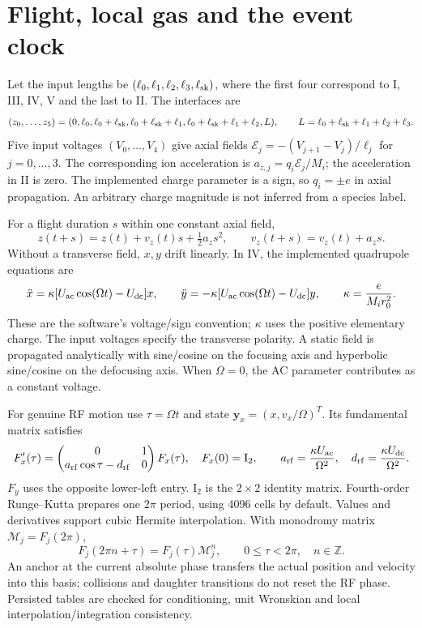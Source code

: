 \documentclass[10pt,a4paper]{article}
\begin{document}
\clearpage
\section{Flight, local gas and the event clock}\label{app:flight}
Let the input lengths be $(\ell_0,\ell_1,\ell_2,\ell_3,\ell_{\rm sk})$,
where the first four correspond to I, III, IV, V and the last to II. The interfaces are
\[
 (z_0,\ldots,z_5)=
 (0,\ell_0,\ell_0+\ell_{\rm sk},
 \ell_0+\ell_{\rm sk}+\ell_1,
 \ell_0+\ell_{\rm sk}+\ell_1+\ell_2,L),
 \qquad L=\ell_0+\ell_{\rm sk}+\ell_1+\ell_2+\ell_3.
\]
Five input voltages $(V_0,\ldots,V_4)$ give axial fields
$\mathcal E_j=-(V_{j+1}-V_j)/\ell_j$ for $j=0,\ldots,3$.
The corresponding ion acceleration is $a_{z,j}=q_i\mathcal E_j/M_i$;
the acceleration in II is zero. The implemented charge parameter is a sign,
so $q_i=\pm e$ in axial propagation. An arbitrary charge magnitude is not
inferred from a species label.

For a flight duration $s$ within one constant axial field,
\[
 z(t+s)=z(t)+v_z(t)s+\tfrac12a_zs^2,\qquad
 v_z(t+s)=v_z(t)+a_zs.
\]
Without a transverse field, $x,y$ drift linearly. In IV, the implemented
quadrupole equations are
\begin{equation}
 \ddot x=\kappa[U_{\rm ac}\cos(\Omega t)-U_{\rm dc}]x,
 \qquad
 \ddot y=-\kappa[U_{\rm ac}\cos(\Omega t)-U_{\rm dc}]y,
 \qquad \kappa=\frac{e}{M_ir_0^2}.\label{eq:rf}
\end{equation}
These are the software's voltage/sign convention; $\kappa$ uses the positive
elementary charge. The input voltages specify the transverse polarity. A
static field is propagated analytically with sine/cosine on the focusing axis
and hyperbolic sine/cosine on the defocusing axis. When $\Omega=0$, the AC
parameter contributes as a constant voltage.

For genuine RF motion use $\tau=\Omega t$ and state
$\mathbf y_x=(x,v_x/\Omega)^T$. Its fundamental matrix satisfies
\[
 F_x'(\tau)=
 \begin{pmatrix}0&1\\a_{\rm rf}\cos\tau-d_{\rm rf}&0\end{pmatrix}F_x(\tau),
 \quad F_x(0)=\mathrm I_2,\qquad
 a_{\rm rf}=\frac{\kappa U_{\rm ac}}{\Omega^2},\quad
 d_{\rm rf}=\frac{\kappa U_{\rm dc}}{\Omega^2}.
\]
$F_y$ uses the opposite lower-left entry. $\mathrm I_2$ is the $2\times2$
identity matrix. Fourth-order Runge--Kutta prepares one $2\pi$ period, using
4096 cells by default. Values and derivatives support cubic Hermite
interpolation. With monodromy matrix $\mathcal M_j=F_j(2\pi)$,
\[
 F_j(2\pi n+\tau)=F_j(\tau)\mathcal M_j^n,
 \qquad 0\leq\tau<2\pi,\quad n\in\mathbb Z.
\]
An anchor at the current absolute phase transfers the actual position and
velocity into this basis; collisions and daughter transitions do not reset the
RF phase. Persisted tables are checked for conditioning, unit Wronskian and
local interpolation/integration consistency.
\end{document}

